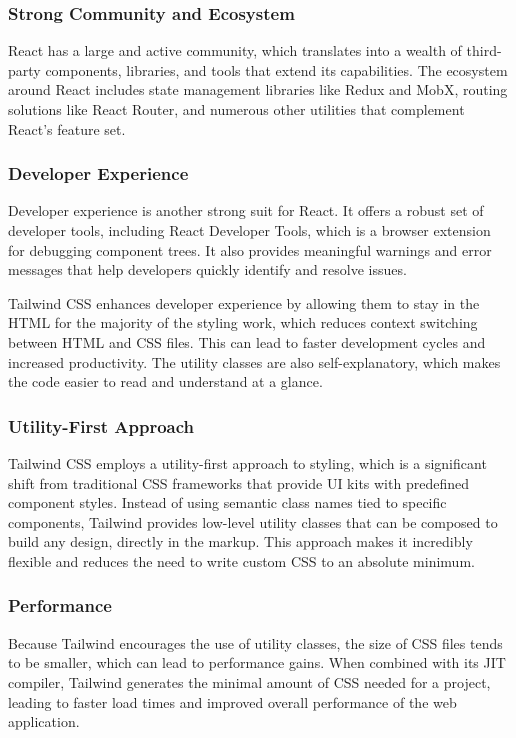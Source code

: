 \subsubsection{Strong Community and Ecosystem} 

React has a large and active community, which translates into a wealth of third-party components, libraries, and tools that extend its capabilities. 
The ecosystem around React includes state management libraries like Redux and MobX, routing solutions like React Router, and numerous other utilities that complement React's feature set.

\subsubsection{Developer Experience} 

Developer experience is another strong suit for React. It offers a robust set of developer tools, including React Developer Tools, which is a browser extension for debugging component trees. 
It also provides meaningful warnings and error messages that help developers quickly identify and resolve issues.

Tailwind CSS enhances developer experience by allowing them to stay in the HTML for the majority of the styling work, which reduces context switching between HTML and CSS files. 
This can lead to faster development cycles and increased productivity. The utility classes are also self-explanatory, which makes the code easier to read and understand at a glance.

\subsubsection{Utility-First Approach} 

Tailwind CSS employs a utility-first approach to styling, which is a significant shift from traditional CSS frameworks that provide UI kits with predefined component styles. 
Instead of using semantic class names tied to specific components, Tailwind provides low-level utility classes that can be composed to build any design, directly in the markup. This approach makes it incredibly flexible and reduces the need to write custom CSS to an absolute minimum.

\subsubsection{Performance} 

Because Tailwind encourages the use of utility classes, the size of CSS files tends to be smaller, which can lead to performance gains. 
When combined with its JIT compiler, Tailwind generates the minimal amount of CSS needed for a project, leading to faster load times and improved overall performance of the web application.

